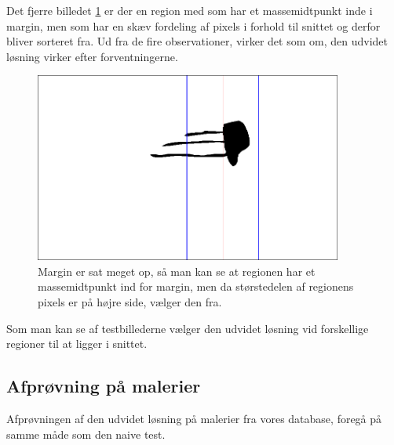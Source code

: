 Det fjerre billedet \ref{bleksprutte_test} er der en region med som har
et massemidtpunkt inde i margin, men som har en skæv fordeling af pixels
i forhold til snittet og derfor bliver sorteret fra. Ud fra de fire
observationer, virker det som om, den udvidet løsning virker efter
forventningerne.

\begin{figure}[h!!]
	\begin{center}
		\includegraphics[width=0.9\textwidth,angle=0]{afsnit/afprovning/billeder/udvidet_losning/udvidet_bleksprutte_test.png}
	\end{center}
	\caption[]{Margin er sat meget op, så man kan se at regionen har et massemidtpunkt ind for margin, men da størstedelen af regionens pixels er på højre side, vælger den fra.}
	\label{bleksprutte_test}
\end{figure}

Som man kan se af testbillederne vælger den udvidet løsning vid
forskellige regioner til at ligger i snittet. 
\clearpage


\subsection{Afprøvning på malerier}
Afprøvningen af den udvidet løsning på malerier fra vores database,
foregå på samme måde som den naive test.

